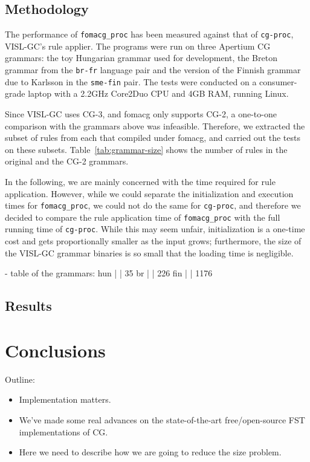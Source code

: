 \documentclass{article}
\begin{document}
\subsection{Methodology}
The performance of \texttt{fomacg\_proc} has been measured against that of
\texttt{cg-proc}, VISL-GC's rule applier. The programs were run on three
Apertium CG grammars: the toy Hungarian grammar used for development, the Breton
grammar from the \texttt{br-fr} language pair and the version of the Finnish
grammar due to Karlsson in the \texttt{sme-fin} pair. %
The tests were conducted on a consumer-grade laptop with a 2.2GHz Core2Duo CPU
and 4GB RAM, running Linux.

Since VISL-GC uses CG-3, and fomacg only supports CG-2, a one-to-one comparison
with the grammars above was infeasible. Therefore, we extracted the subset of
rules from each that compiled under fomacg, and carried out the tests on these
subsets. Table~\ref{tab:grammar-size} shows the number of rules in the original
and the CG-2 grammars.

In the following, we are mainly concerned with the time required for rule
application. However, while we could separate the initialization and execution
times for \texttt{fomacg\_proc}, we could not do the same for \texttt{cg-proc},
and therefore we decided to compare the rule application time of
\texttt{fomacg\_proc} with the full running time of \texttt{cg-proc}.
While this may seem unfair, initialization is a one-time cost and gets
proportionally smaller as the input grows; furthermore, the size of the VISL-GC
grammar binaries is so small that the loading time is negligible.

- table of the grammars: %
  hun | | 35 
  br  | | 226
  fin | | 1176

\subsection{Results}

\section{Conclusions}
\label{sec:conclusion}
Outline:
\begin{itemize}
\item Implementation matters.
\item We've made some real advances on the state-of-the-art free/open-source
  FST implementations of CG. 
\item Here we need to describe how we are going to reduce the size problem.
\end{itemize}
\end{document}
